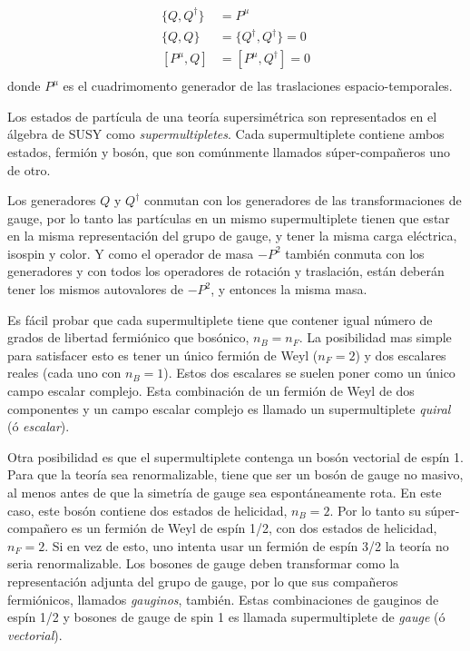 \begin{align}
  \{Q, Q^\dagger\} &= P^\mu \\ \{Q, Q\} &= \{Q^\dagger, Q^\dagger\} = 0
  \\ [P^\mu, Q] &= [P^\mu, Q^\dagger] = 0 \\
\end{align}
%
donde $P^\mu$ es el cuadrimomento generador de las traslaciones
espacio-temporales.

Los estados de partícula de una teoría supersimétrica son representados en el
álgebra de SUSY como \emph{supermultipletes}. Cada supermultiplete contiene
ambos estados, fermión y bosón, que son comúnmente llamados súper-compa\~neros
uno de otro.

Los generadores $Q$ y $Q^\dagger$ conmutan con los generadores de las
transformaciones de gauge, por lo tanto las partículas en un mismo
supermultiplete tienen que estar en la misma representación del grupo de gauge,
y tener la misma carga eléctrica, isospin y color. Y como el operador de masa
$-P^2$ también conmuta con los generadores y con todos los operadores de
rotación y traslación, están deberán tener los mismos autovalores de $-P^2$, y
entonces la misma masa.

Es fácil probar que cada supermultiplete tiene que contener igual número de
grados de libertad fermiónico que bosónico, $n_B = n_F$. La posibilidad mas
simple para satisfacer esto es tener un único fermión de Weyl ($n_F=2$) y dos
escalares reales (cada uno con $n_B=1$). Estos dos escalares se suelen poner
como un único campo escalar complejo. Esta combinación de un fermión de Weyl de
dos componentes y un campo escalar complejo es llamado un supermultiplete
\emph{quiral} (ó \emph{escalar}).

Otra posibilidad es que el supermultiplete contenga un bosón vectorial de espín
1. Para que la teoría sea renormalizable, tiene que ser un bosón de gauge no
masivo, al menos antes de que la simetría de gauge sea espontáneamente rota. En
este caso, este bosón contiene dos estados de helicidad, $n_B=2$. Por lo tanto
su súper-compa\~nero es un fermión de Weyl de espín 1/2, con dos estados de
helicidad, $n_F=2$. Si en vez de esto, uno intenta usar un fermión de espín 3/2
la teoría no seria renormalizable. Los bosones de gauge deben transformar como
la representación adjunta del grupo de gauge, por lo que sus compañeros
fermiónicos, llamados \emph{gauginos}, también. Estas combinaciones de gauginos
de espín 1/2 y bosones de gauge de spin 1 es llamada supermultiplete de
\emph{gauge} (ó \emph{vectorial}).

